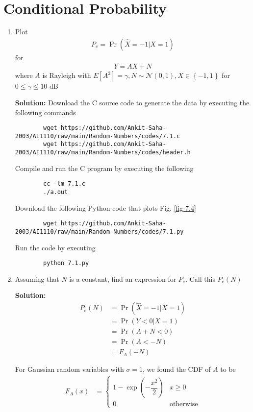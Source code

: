 \documentclass[journal,12pt,twocolumn]{IEEEtran}
\newcommand{\solution}{\noindent \textbf{Solution: }}
\providecommand{\pr}[1]{\ensuremath{\Pr\left(#1\right)}}
\providecommand{\brak}[1]{\ensuremath{\left(#1\right)}}
\providecommand{\cbrak}[1]{\ensuremath{\left\{#1\right\}}}
\providecommand{\sbrak}[1]{\ensuremath{\left[#1\right]}}
\providecommand{\gauss}[2]{\mathcal{N}\ensuremath{\left(#1,#2\right)}}
\numberwithin{equation}{section}
\renewcommand\thesection{\arabic{section}}
\begin{document}
	\section{Conditional Probability}
	\begin{enumerate}[label=\thesection.\arabic*,ref=\thesection.\theenumi]
	\item Plot 
	\begin{align}
		P_e = \pr{\hat{X} = -1|X=1}	
	\end{align}
	for 
	\begin{align}
		Y = AX+N
	\end{align}
	where $A$ is Rayleigh with $E\sbrak{A^2} = \gamma, N \sim \gauss{0}{1}, X \in \cbrak{-1,1}$ for $0 \le \gamma \le 10$ dB
	
	\solution Download the C source code to generate the data by executing the following commands
	\begin{lstlisting}
		wget https://github.com/Ankit-Saha-2003/AI1110/raw/main/Random-Numbers/codes/7.1.c
		wget https://github.com/Ankit-Saha-2003/AI1110/raw/main/Random-Numbers/codes/header.h
	\end{lstlisting}
	Compile and run the C program by executing the following
	\begin{lstlisting}
		cc -lm 7.1.c
		./a.out
	\end{lstlisting}
	
	Download the following Python code that plots Fig. \ref{fig-7.4} 
	\begin{lstlisting}
		wget https://github.com/Ankit-Saha-2003/AI1110/raw/main/Random-Numbers/codes/7.1.py
	\end{lstlisting}
	Run the code by executing
	\begin{lstlisting}
		python 7.1.py
	\end{lstlisting}
	
	\item Assuming that $N$ is a constant, find an expression for $P_e$.  Call this $P_e(N)$
	
	\solution 
	\begin{align}
		P_e(N) &= \pr{\hat{X} = -1|X = 1} \\
		&= \pr{Y<0|X=1} \\
		&= \pr{A+N<0} \\
		&= \pr{A<-N} \\
		&= F_A(-N)
	\end{align}
	
	For Gaussian random variables with $\sigma = 1$, we found the CDF of $A$ to be
	\begin{align}
		F_A(x) &= 
		\begin{cases}
			1 - \exp\brak{-\dfrac{x^2}{2}} & x \geq 0 \\
			0 & \text{otherwise}
		\end{cases}
	\end{align}
	

\end{enumerate}
\end{document}
